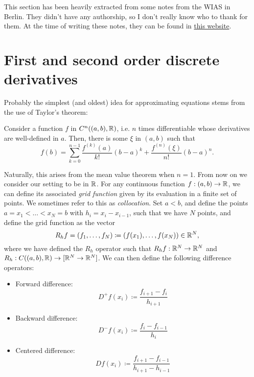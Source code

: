 This section has been heavily extracted from some notes from the WIAS in Berlin. They didn't have any authorship, so I don't really know who to thank for them. At the time of writing these notes, they can be found in \href{https://www.wias-berlin.de/people/john/LEHRE/NUMERIK\_IV\_21\_22/num\_konv\_dom\_prob\_3.pdf}{this website}.
\section{First and second order discrete derivatives}
Probably the simplest (and oldest) idea for approximating equations stems from the use of Taylor's theorem:
\begin{theorem}\label{thm:taylor}
    Consider a function $f$ in $C^n((a,b), \mathbb{R})$, i.e. $n$ times differentiable whose derivatives are well-defined in $a$. Then, there is some $\xi$ in $(a,b)$ such that
    \begin{equation}
    f(b) = \sum_{k=0}^{n-1}\frac{f^{(k)}(a)}{k!}(b-a)^k + \frac{f^{(n)}(\xi)}{n!}(b-a)^n.
    \end{equation}
\end{theorem}
Naturally, this arises from the mean value theorem when $n=1$. From now on we consider our setting to be in $\mathbb{R}$. For any continuous function $f:(a,b)\to \mathbb{R}$, we can define its associated \emph{grid function} given by its evaluation in a finite set of points. We sometimes refer to this as \emph{collocation}. Set $a<b$, and define the points $a=x_1<\hdots<x_N=b$ with $h_i=x_{i}-x_{i-1}$, such that we have $N$ points, and define the grid function as the vector
    \begin{equation}\label{eq:def-grid-function}
    R_hf = (f_1, \hdots, f_N) \coloneqq (f(x_1), \hdots, f(x_N)) \in \mathbb{R}^N,
    \end{equation}
    where we have defined the $R_h$ operator such that $R_h f:\mathbb{R}^N \to \mathbb{R}^N$ and $R_h:C((a,b),\mathbb{R})\to [\mathbb{R}^N\to\mathbb{R}^N]$.  We can then define the following difference operators: 
    \begin{itemize}
        \item Forward difference: 
            \begin{equation*}
            D^+f(x_i) \coloneqq \frac{f_{i+1} - f_i}{h_{i+1}}
            \end{equation*}
        \item Backward difference: 
            \begin{equation*}
            D^-f(x_i) \coloneqq \frac{f_{i} - f_{i-1}}{h_{i}}
            \end{equation*}
        \item Centered difference:
            \begin{equation*}
            Df(x_i) \coloneqq \frac{f_{i+1} - f_{i-1}}{h_{i+1} - h_{i-1}}
            \end{equation*}
    \end{itemize}
